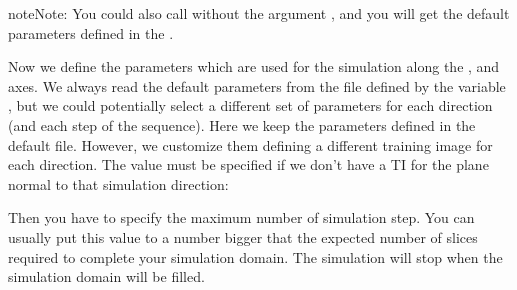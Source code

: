 \documentclass[letterpaper,10pt,english]{sphinxmanual}
\begin{document}
\begin{sphinxadmonition}{note}{Note:}
You could also call  without the argument
, and you will get the default parameters defined in
the .
\end{sphinxadmonition}

Now we define the parameters which are used for the simulation along
the ,  and  axes. We always read the default parameters from
the file defined by the variable , but we could
potentially select a different set of parameters for each direction
(and each step of the sequence). Here we keep the parameters defined
in the default  file. However, we customize them
defining a different training image for each direction.  The value
 must be specified if we don’t have a TI for the plane normal
to that simulation direction:

\begin{sphinxVerbatim}[commandchars=\\\{\}]
  
\PYG{p}{[}\PYG{p}{]}  
  
\PYG{p}{[}\PYG{p}{]}  
  
\PYG{p}{[}\PYG{p}{]}  
\end{sphinxVerbatim}

Then you have to specify the maximum number of simulation step.
You can usually put this value to a number bigger that the expected
number of slices required to complete your simulation domain. The
simulation will stop when the simulation domain will be filled.
\end{document}
